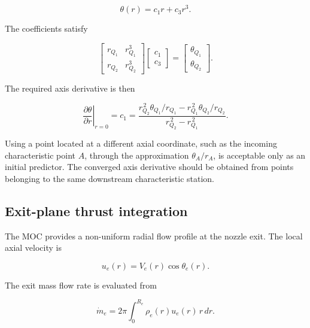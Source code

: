 \begin{equation}
\theta(r)=c_1r+c_3r^3.
\end{equation}

The coefficients satisfy

\begin{equation}
\begin{bmatrix}
r_{Q_1} & r_{Q_1}^3\\
r_{Q_2} & r_{Q_2}^3
\end{bmatrix}
\begin{bmatrix}
c_1\\
c_3
\end{bmatrix}
=
\begin{bmatrix}
\theta_{Q_1}\\
\theta_{Q_2}
\end{bmatrix}.
\label{eq:axis_odd_polynomial_fit}
\end{equation}

The required axis derivative is then

\begin{equation}
\boxed{
\left.
\frac{\partial\theta}{\partial r}
\right|_{r=0}
=
c_1
=
\frac{
r_{Q_2}^{\,2}\theta_{Q_1}/r_{Q_1}
-
r_{Q_1}^{\,2}\theta_{Q_2}/r_{Q_2}
}{
r_{Q_2}^{\,2}-r_{Q_1}^{\,2}
}
}.
\label{eq:axis_derivative_second_order}
\end{equation}

Using a point located at a different axial coordinate, such as the
incoming characteristic point \(A\), through the approximation
\(\theta_A/r_A\), is acceptable only as an initial predictor. The
converged axis derivative should be obtained from points belonging to
the same downstream characteristic station.
\subsection{Exit-plane thrust integration}

The MOC provides a non-uniform radial flow profile at the nozzle exit.
The local axial velocity is

\begin{equation}
    u_e(r)=V_e(r)\cos\theta_e(r).
\end{equation}

The exit mass flow rate is evaluated from

\begin{equation}
    \boxed{
    \dot{m}_e
    =
    2\pi
    \int_0^{R_e}
    \rho_e(r)u_e(r)\,r\,dr
    }.
    \label{eq:moc_exit_massflow}
\end{equation}


